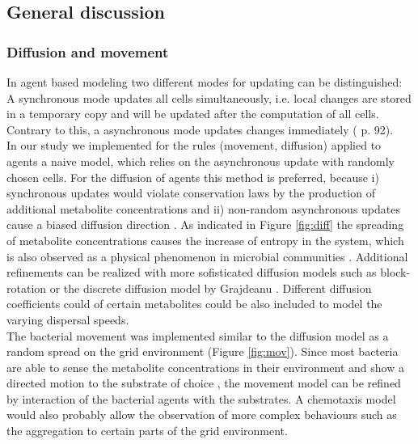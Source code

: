 \subsection{General discussion}


\subsubsection{Diffusion and movement}
In agent based modeling two different modes for updating can be distinguished:
A synchronous mode updates all cells simultaneously, i.e. local changes are stored in a temporary copy and will be updated after the computation of all cells.
Contrary to this, a asynchronous mode updates changes immediately (\cite{Matthies2002} p. 92).\\
In our study we implemented for the rules (movement, diffusion) applied to agents a naive model, which relies on the asynchronous update with randomly chosen cells.
For the diffusion of agents this method is preferred, because i) synchronous updates would violate conservation laws by the production of additional metabolite concentrations and ii) non-random asynchronous updates cause a biased diffusion direction \cite{Bandman1999}.
As indicated in Figure \hyperref[fig:diff]{\ref{fig:diff}} the spreading of metabolite concentrations causes the increase of entropy in the system, which is also observed as a physical phenomenon in microbial communities \cite{Wetzel93}.
Additional refinements can be realized with more sofisticated diffusion models such as block-rotation \cite{Bandman1999} or the discrete diffusion model by Grajdeanu \cite{Grajdeanu2007}.
Different diffusion coefficients could of certain metabolites could be also included to model the varying dispersal speeds.\\
The bacterial movement was implemented similar to the diffusion model as a random spread on the grid environment (Figure \hyperref[fig:mov]{\ref{fig:mov}}).
Since most bacteria are able to sense the metabolite concentrations in their environment and show a directed motion to the substrate of choice \cite{Francisco13}, the movement model can be refined by interaction of the bacterial agents with the substrates.
A chemotaxis model would also probably allow the observation of more complex behaviours such as the aggregation to certain parts of the grid environment.

